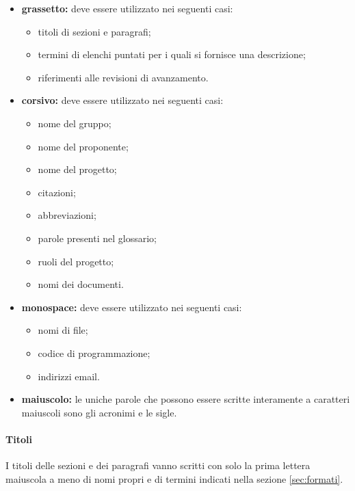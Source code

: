                 \begin{itemize}
                    \item \textbf{grassetto:} deve essere utilizzato nei seguenti casi:
                        \begin{itemize}
                            \item titoli di sezioni e paragrafi;
                            \item termini di elenchi puntati per i quali si fornisce una descrizione;
                            \item riferimenti alle revisioni di avanzamento.
                        \end{itemize}
                    \item \textbf{corsivo:} deve essere utilizzato nei seguenti casi:
                        \begin{itemize}
                            \item nome del gruppo;
                            \item nome del proponente;
                            \item nome del progetto;
                            \item citazioni;
                            \item abbreviazioni;
                            \item parole presenti nel glossario;
                            \item ruoli del progetto;
                            \item nomi dei documenti.
                        \end{itemize}
                    \item \textbf{monospace:} deve essere utilizzato nei seguenti casi:
                        \begin{itemize}
                            \item nomi di file;
                            \item codice di programmazione;
                            \item indirizzi email.
                        \end{itemize}
                    \item \textbf{maiuscolo:} le uniche parole che possono essere scritte interamente a caratteri maiuscoli sono gli acronimi e le sigle.
                \end{itemize}
                \paragraph{Titoli}
                I titoli delle sezioni e dei paragrafi vanno scritti con solo la prima lettera maiuscola a meno di nomi propri e di termini indicati nella sezione \ref{sec:formati}.
